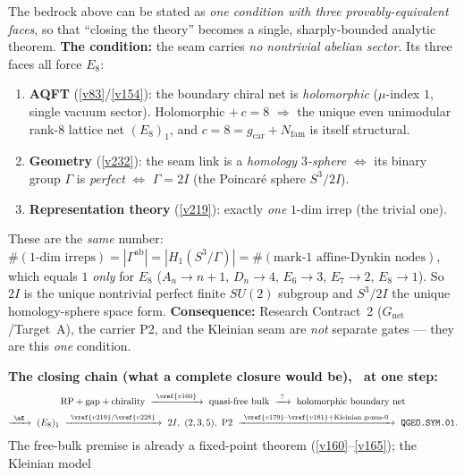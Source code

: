 \documentclass[11pt,a4paper]{article}
\newcommand{\Nfam}{N_{\mathrm{fam}}}
\newcommand{\gcar}{g_{\mathrm{car}}}
\begin{document}
\begin{keybox}
The bedrock above can be stated as \emph{one condition with three provably-equivalent faces}, so that
``closing the theory'' becomes a single, sharply-bounded analytic theorem. \textbf{The condition:} the seam
carries \emph{no nontrivial abelian sector}. Its three faces all force $E_8$:
\begin{enumerate}[leftmargin=1.7em,itemsep=1pt]
\item \textbf{AQFT} (\vref{v83}/\vref{v154}): the boundary chiral net is \emph{holomorphic} ($\mu$-index $1$,
single vacuum sector). Holomorphic $+\,c=8$ $\Rightarrow$ the unique even unimodular rank-$8$ lattice net
$(E_8)_1$, and $c=8=\gcar+\Nfam$ is itself structural.
\item \textbf{Geometry} (\vref{v232}): the seam link is a \emph{homology $3$-sphere} $\Leftrightarrow$ its
binary group $\Gamma$ is \emph{perfect} $\Leftrightarrow$ $\Gamma=2I$ (the Poincar\'e sphere $S^3/2I$).
\item \textbf{Representation theory} (\vref{v219}): exactly \emph{one} $1$-dim irrep (the trivial one).
\end{enumerate}
These are the \emph{same} number: $\#(1\text{-dim irreps})=|\Gamma^{\mathrm{ab}}|=|H_1(S^3/\Gamma)|
=\#(\text{mark-}1\text{ affine-Dynkin nodes})$, which equals $1$ \emph{only} for $E_8$ ($A_n{\to}n{+}1$,
$D_n{\to}4$, $E_6{\to}3$, $E_7{\to}2$, $E_8{\to}1$). So $2I$ is the unique nontrivial perfect finite
$SU(2)$ subgroup and $S^3/2I$ the unique homology-sphere space form. \textbf{Consequence:} Research
Contract~2 ($G_{\mathrm{net}}$/Target~A), the carrier P2, and the Kleinian seam are \emph{not} separate
gates --- they are this \emph{one} condition.
\par\smallskip\noindent\textbf{The closing chain (what a complete closure would be), \mO\ at one step:}
\[
\begin{gathered}
  \text{RP}+\text{gap}+\text{chirality}\ \xrightarrow{\ \vref{v160}\ }\ \text{quasi-free bulk}
  \ \xrightarrow{\ ?\ }\ \text{holomorphic boundary net}\\[2pt]
  \xrightarrow{\ \mE\ }\ (E_8)_1\ \xrightarrow{\ \vref{v219}/\vref{v228}\ }\ 2I,\ (2,3,5),\ \text{P2}
  \ \xrightarrow{\ \vref{v179}\text{--}\vref{v181}+\text{Kleinian genus-}0\ }\ \texttt{QGEO.SYM.01}.
\end{gathered}
\]
The free-bulk premise is already a fixed-point theorem (\vref{v160}--\vref{v165}); the Kleinian model

\end{keybox}
\end{document}
